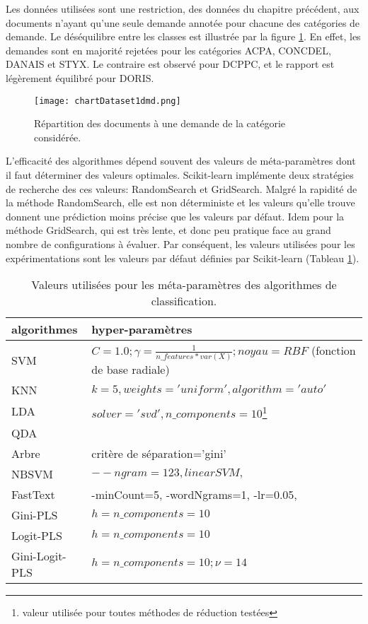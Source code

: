 Les données utilisées sont une restriction, des données du chapitre précédent, aux documents n'ayant qu'une seule demande annotée pour chacune des catégories de demande. Le déséquilibre entre les classes est illustrée par la figure \ref{fig:sensresultat:stat-1dmd}. En effet, les demandes sont en majorité rejetées pour les catégories ACPA, CONCDEL, DANAIS et STYX. Le contraire est observé pour DCPPC, et le rapport est légèrement équilibré pour DORIS.
\begin{figure}[htb]
\texttt{[image: chartDataset1dmd.png]}
\caption{Répartition des documents à une demande de la catégorie considérée.}\label{fig:sensresultat:stat-1dmd}
\end{figure}

L'efficacité des algorithmes dépend souvent des valeurs de méta-paramètres dont il faut déterminer des valeurs optimales. Scikit-learn implémente deux stratégies de recherche des ces valeurs: RandomSearch et GridSearch. Malgré la rapidité de la méthode RandomSearch, elle est non déterministe et les valeurs qu'elle trouve donnent une prédiction moins précise que les valeurs par défaut. Idem pour la méthode GridSearch, qui est très lente, et donc peu pratique face au grand nombre de configurations à évaluer. Par conséquent, les valeurs utilisées pour les expérimentations sont les valeurs par défaut définies par Scikit-learn (Tableau \ref{tab:sensrst:metapara}).

\begin{table}[htb]
	\scriptsize
	\centering
	\begin{tabular}{|l|p{}|}
		\hline
		algorithmes & hyper-paramètres\\ \hline
		SVM & $C=1.0; \gamma=\frac{1}{n\_features * var(X)}; noyau=RBF$ (fonction de base radiale)\\ \hline
		KNN & $k = 5, weights='uniform', algorithm='auto'$ \\ \hline
		LDA &  $solver='svd', n\_components=10$\footnote{valeur utilisée pour toutes méthodes de réduction testées}  \\ \hline
		QDA &   \\ \hline
		Arbre & critère de séparation='gini' \\ \hline
		NBSVM & $--ngram=123, linearSVM, $ \\ \hline
		FastText & -minCount=5, -wordNgrams=1, -lr=0.05,    \\ \hline
		Gini-PLS & $h=n\_components=10$ \\ \hline
		Logit-PLS & $h=n\_components=10$  \\ \hline
		Gini-Logit-PLS & $h=n\_components=10; \nu = 14$ \\ \hline
	\end{tabular}
	\caption{Valeurs utilisées pour les méta-paramètres des algorithmes de classification.}\label{tab:sensrst:metapara}
\end{table}

